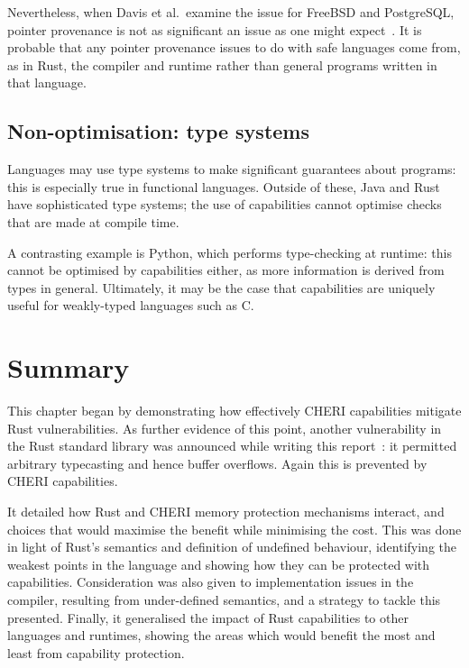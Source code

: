 \documentclass[dissertation.tex]{subfiles}
\begin{document}
Nevertheless, when Davis et al.\ examine the issue for FreeBSD and
PostgreSQL, pointer provenance is not as significant an issue as one
might expect~\cite{cheri-2019-abstract}.
It is probable that any pointer provenance issues to do with safe
languages come from, as in Rust, the compiler and runtime rather than
general programs written in that language.


\subsection{Non-optimisation: type systems}
Languages may use type systems to make significant guarantees about
programs: this is especially true in functional languages.
Outside of these, Java and Rust have sophisticated type systems; the use
of capabilities cannot optimise checks that are made at compile time.

A contrasting example is Python, which performs type-checking at
runtime: this cannot be optimised by capabilities either, as more
information is derived from types in general.
Ultimately, it may be the case that capabilities are uniquely useful for
weakly-typed languages such as C.


\section{Summary}
\label{sec:eval-summary}

This chapter began by demonstrating how effectively CHERI capabilities
mitigate Rust vulnerabilities.
As further evidence of this point, another vulnerability in the Rust
standard library was announced while writing this
report~\cite{rust-advisory-cast}: it permitted arbitrary typecasting and
hence buffer overflows.
Again this is prevented by CHERI capabilities.

It detailed how Rust and CHERI memory protection mechanisms interact,
and choices that would maximise the benefit while minimising the cost.
This was done in light of Rust's semantics and definition of undefined
behaviour, identifying the weakest points in the language and showing
how they can be protected with capabilities.
Consideration was also given to implementation issues in the compiler,
resulting from under-defined semantics, and a strategy to tackle this
presented.
Finally, it generalised the impact of Rust capabilities to other
languages and runtimes, showing the areas which would benefit the most
and least from capability protection.
\end{document}
